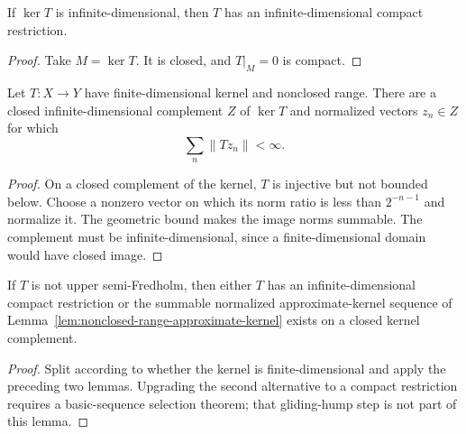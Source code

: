 \begin{lemma}\label{lem:infinite-kernel-compact-restriction}
If $\ker T$ is infinite-dimensional, then $T$ has an infinite-dimensional compact restriction.
\leanok
\end{lemma}

\begin{proof}
Take $M=\ker T$.  It is closed, and $T|_M=0$ is compact.
\end{proof}

\begin{lemma}\label{lem:nonclosed-range-approximate-kernel}
Let $T:X\to Y$ have finite-dimensional kernel and nonclosed range.  There are a closed
infinite-dimensional complement $Z$ of $\ker T$ and normalized vectors $z_n\in Z$ for which
\[
  \sum_n \lVert Tz_n\rVert<\infty .
\]
\leanok
\end{lemma}

\begin{proof}
On a closed complement of the kernel, $T$ is injective but not bounded below.  Choose a
nonzero vector on which its norm ratio is less than $2^{-n-1}$ and normalize it.  The geometric
bound makes the image norms summable.  The complement must be infinite-dimensional, since a
finite-dimensional domain would have closed image.
\end{proof}

\begin{lemma}\label{lem:not-upper-semi-dichotomy}
If $T$ is not upper semi-Fredholm, then either $T$ has an infinite-dimensional compact
restriction or the summable normalized approximate-kernel sequence of
Lemma~\ref{lem:nonclosed-range-approximate-kernel} exists on a closed kernel complement.
\leanok
\end{lemma}

\begin{proof}
Split according to whether the kernel is finite-dimensional and apply the preceding two lemmas.
Upgrading the second alternative to a compact restriction requires a basic-sequence selection
theorem; that gliding-hump step is not part of this lemma.
\end{proof}

